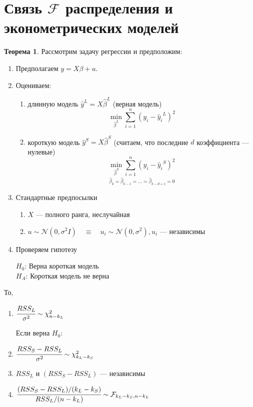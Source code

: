 \documentclass[12pt]{article} %
\theoremstyle{definition} %
\def \hb{\hat{\beta}}
\def \s{\sigma}
\def \hy{\hat{y}}
\def \cN{\mathcal{N}}
\def \cF{\mathcal{F}}
\def \cChi{\mathcal{\chi}}
\begin{document}
\section{Связь $\cF$ распределения и эконометрических моделей}
\newtheorem*{theo_n}{Теорема}
\begin{theo_n}
    Рассмотрим задачу регрессии  и предположим:
    \begin{enumerate}
        \item Предполагаем $y=X\beta+u$.
        \item Оцениваем:
        \begin{enumerate}
            \item длинную модель $\hy^L = X\hb^L$ (верная модель)
            \[
                \underset{\hb^L}{\min}\sum_{i=1}^n \left(y_i - {\hy_i}^L \right)^2
            \]
            \item короткую модель $\hy^S = X\hb^S$ (считаем, что последние $d$ коэффициента — нулевые)
            \[
                \underset{\hb_k=\hb_{k-1}=...=\hb_{k-d+1}=0}{\underset{\hb^S}{\min}\sum_{i=1}^n\left(y_i - {\hy_i}^S \right)^2}
            \] 
        \end{enumerate} 
        \item Стандартные предпосылки
        \begin{enumerate}
            \item $X$ — полного ранга, неслучайная
            \item  $u \sim \cN(0, \s^2I) \quad \equiv \quad u_i \sim \cN(0,\s^2), u_i$ — независимы
        \end{enumerate}
        \item Проверяем гипотезу
         \begin{center}
            $H_0$: Верна короткая модель \\
            \hspace{0.5cm}$H_A$: Короткая модель не верна
        \end{center}
    \end{enumerate}
    То,
    \begin{enumerate}
        \item $\cfrac{RSS_L}{\s^2}\sim \cChi_{n-k_L}^2$\par
        Если верна $H_0$:
        \item $\cfrac{RSS_S - RSS_L}{\s^2}\sim \cChi_{k_L - k_S}^2$ 
        \item $RSS_L \text{ и } (RSS_S - RSS_L)$ — независимы
        \item $\cfrac{(RSS_S - RSS_L)/(k_L - k_S)}{RSS_L/(n-k_L)}\sim \cF_{k_L - k_S, n-k_L}$
    \end{enumerate}
\end{theo_n}
\end{document}
